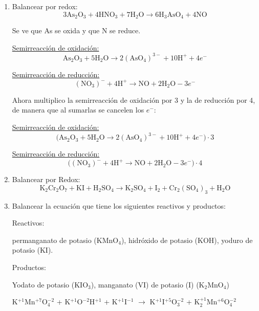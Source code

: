 \begin{enumerate}

\item Balancear por redox:
$$3\text{As}_2\text{O}_3 + 4\text{HNO}_3 + 7\text{H}_2\text{O} \rightarrow
6\text{H}_3 \text{AsO}_4 + 4\text{NO}$$

Se ve que As se oxida y que N se reduce.

\begin{multicols}{2}

\underline{Semirreacción de oxidación:}
$$\text{As}_2\text{O}_3 + 5\text{H}_2\text{O}\longrightarrow
2(\text{AsO}_4)^{3-} + 10\text{H}^+ + 4e^-$$

\underline{Semirreacción de reducción:}
$$(\text{NO}_3)^{-} + 4 \text{H}^+ \longrightarrow
\text{NO} + 2\text{H}_2\text{O} - 3e^-$$
\end{multicols}

Ahora multiplico la semirreacción de oxidación por 3 y la de reducción por 4, de manera que al sumarlas se cancelen los $e^-$:

\begin{multicols}{2}

\underline{Semirreacción de oxidación:}
$$\big(\text{As}_2\text{O}_3 + 5\text{H}_2\text{O}\longrightarrow
2(\text{AsO}_4)^{3-} + 10\text{H}^+ + 4e^-\big) \cdot 3$$

\underline{Semirreacción de reducción:}
$$\big((\text{NO}_3)^{-} + 4 \text{H}^+ \longrightarrow
\text{NO} + 2\text{H}_2\text{O} - 3e^-\big) \cdot 4$$
\end{multicols}


\item Balancear por Redox:
$$\text{K}_2\text{Cr}_2\text{O}_7 + \text{KI} + \text{H}_2\text{SO}_4 \longrightarrow \text{K}_2\text{SO}_4 + \text{I}_2 + \text{Cr}_2(\text{SO}_4)_3 + \text{H}_2\text{O}$$


\item 
Balancear la ecuación que tiene los siguientes reactivos y productos:

Reactivos:

permanganato de potasio (KMnO$_4$), hidróxido de potasio (KOH), yoduro de potasio (KI).

\skipline
Productos:

Yodato de potasio (KIO$_3$), manganato (VI) de potasio (I) (K$_2$MnO$_4$)

\skipline
{\large
\hfil
K$^{+1}$Mn$^{+7}$O$_4^{-2}$ \hfil+\hfil
K$^{+1}$O$^{-2}$H$^{+1}$ \hfil+\hfil
K$^{+1}$I$^{-1}$ \hfil$\longrightarrow$\hfil
K$^{+1}$I$^{+5}$O$_3^{-2}$ \hfil+\hfil
K$_2^{+1}$Mn$^{+6}$O$_4^{-2}$
\hfil
}
\end{enumerate}


